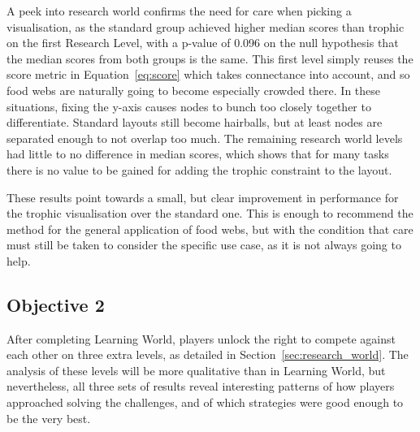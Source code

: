 A peek into research world confirms the need for care when picking a visualisation, as the standard group achieved higher median scores than trophic on the first Research Level, with a p-value of 0.096 on the null hypothesis that the median scores from both groups is the same. This first level simply reuses the score metric in Equation~\eqref{eq:score} which takes connectance into account, and so food webs are naturally going to become especially crowded there. In these situations, fixing the y-axis causes nodes to bunch too closely together to differentiate. Standard layouts still become hairballs, but at least nodes are separated enough to not overlap too much.
The remaining research world levels had little to no difference in median scores, which shows that for many tasks there is no value to be gained for adding the trophic constraint to the layout.

These results point towards a small, but clear improvement in performance for the trophic visualisation over the standard one. This is enough to recommend the method for the general application of food webs, but with the condition that care must still be taken to consider the specific use case, as it is not always going to help.

\subsection{Objective 2}
\label{sec:hypothesis2}

After completing Learning World, players unlock the right to compete against each other on three extra levels, as detailed in Section~\ref{sec:research_world}.
The analysis of these levels will be more qualitative than in Learning World, but nevertheless, all three sets of results reveal interesting patterns of how players approached solving the challenges, and of which strategies were good enough to be the very best.

